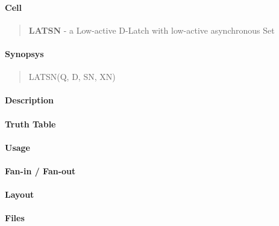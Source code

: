 \label{LATSN}
\paragraph{Cell}
\begin{quote}
    \textbf{LATSN} - a Low-active D-Latch with low-active asynchronous Set
\end{quote}

\paragraph{Synopsys}
\begin{quote}
    LATSN(Q, D, SN, XN)
\end{quote}

\paragraph{Description}

%

\paragraph{Truth Table}
%

\paragraph{Usage}

\paragraph{Fan-in / Fan-out}

\paragraph{Layout}

\paragraph{Files}

